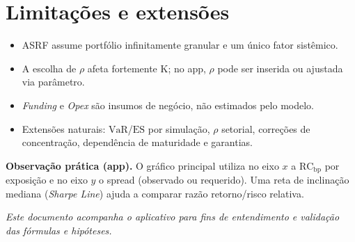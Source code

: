 \documentclass[11pt,a4paper]{article}
\newcommand{\Kcap}{\mathrm{K}}
\newcommand{\Rho}{\rho}
\newcommand{\VaR}{\mathrm{VaR}}
\newcommand{\ES}{\mathrm{ES}}
\newcommand{\bp}{\mathrm{bp}}
\begin{document}
\section{Limitações e extensões}
\begin{itemize}[leftmargin=1.2em]
  \item ASRF assume portfólio infinitamente granular e um único fator sistêmico.
  \item A escolha de \(\Rho\) afeta fortemente \(\Kcap\); no app, \(\Rho\) pode ser inserida ou ajustada via parâmetro.
  \item \emph{Funding} e \emph{Opex} são insumos de negócio, não estimados pelo modelo.
  \item Extensões naturais: \(\VaR\)/\(\ES\) por simulação, \(\Rho\) setorial, correções de concentração, dependência de maturidade e garantias.
\end{itemize}

\vspace{1em}
\noindent\textbf{Observação prática (app).} O gráfico principal utiliza no eixo \(x\) a \(\mathrm{RC}_{\bp}\) por exposição e no eixo \(y\) o spread (observado ou requerido). Uma reta de inclinação mediana (\emph{Sharpe Line}) ajuda a comparar razão retorno/risco relativa.

\vfill
\begin{center}
\textit{Este documento acompanha o aplicativo para fins de entendimento e validação das fórmulas e hipóteses.}
\end{center}
\end{document}
